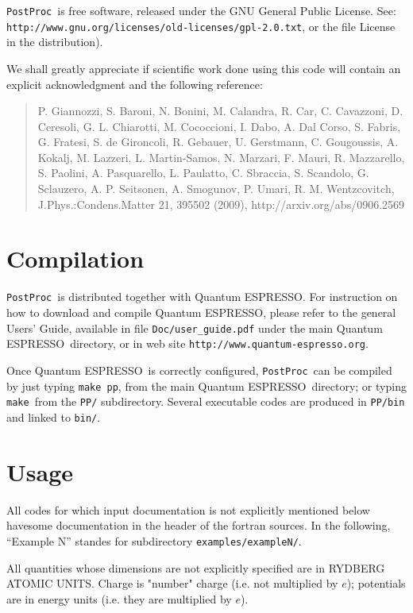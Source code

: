 \documentclass[12pt,a4paper]{article}
\def\qe{{\sc Quantum ESPRESSO}}
\def\PostProc{\texttt{PostProc}}
\def\make{\texttt{make}}
\begin{document}
\PostProc\ is free software, released under the 
GNU General Public License. See:\\
\texttt{http://www.gnu.org/licenses/old-licenses/gpl-2.0.txt}, 
or the file License in the distribution).
    
We shall greatly appreciate if scientific work done using this code will 
contain an explicit acknowledgment and the following reference:
\begin{quote}
P. Giannozzi, S. Baroni, N. Bonini, M. Calandra, R. Car, C. Cavazzoni,
D. Ceresoli, G. L. Chiarotti, M. Cococcioni, I. Dabo, A. Dal Corso,
S. Fabris, G. Fratesi, S. de Gironcoli, R. Gebauer, U. Gerstmann,
C. Gougoussis, A. Kokalj, M. Lazzeri, L. Martin-Samos, N. Marzari,
F. Mauri, R. Mazzarello, S. Paolini, A. Pasquarello, L. Paulatto,
C. Sbraccia, S. Scandolo, G. Sclauzero, A. P. Seitsonen, A. Smogunov,
P. Umari, R. M. Wentzcovitch, J.Phys.:Condens.Matter 21, 395502 (2009),
http://arxiv.org/abs/0906.2569
\end{quote}
\section{Compilation}

\PostProc\ is distributed together with \qe.
For instruction on how to download and compile \qe, please refer 
to the general Users' Guide, available in file \texttt{Doc/user\_guide.pdf}
under the main \qe\ directory, or in web site 
\texttt{http://www.quantum-espresso.org}.

Once \qe\ is correctly configured, \PostProc\ can be compiled by
just typing \texttt{make pp}, from the main \qe\ directory;
or typing \make\ from the \texttt{PP/} subdirectory.
Several executable codes are produced in \texttt{PP/bin}
and linked to \texttt{bin/}.

\section{Usage}

All codes for which input documentation is not explicitly mentioned below
havesome documentation in the header of the fortran sources.
In the following, ``Example N'' standes for subdirectory 
\texttt{examples/exampleN/}.

All quantities whose dimensions are not explicitly specified are in
RYDBERG ATOMIC UNITS. Charge is "number" charge (i.e. not multiplied 
by $e$); potentials are in energy units (i.e. they are multiplied by 
$e$).
\end{document}

